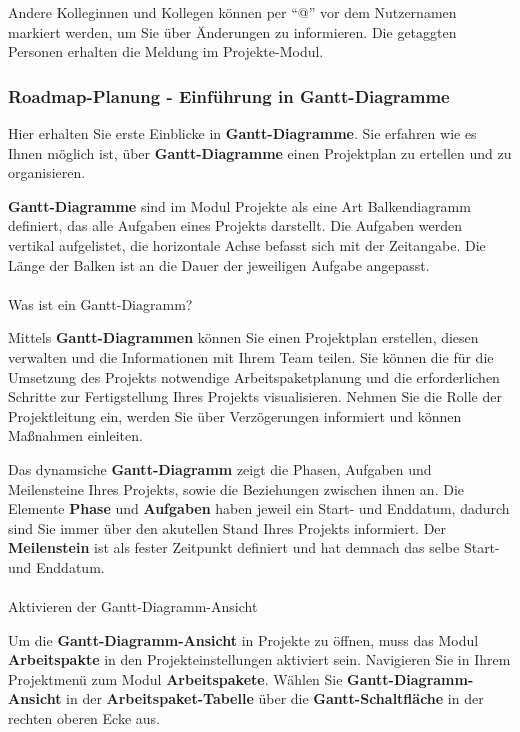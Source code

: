 \documentclass[
  letterpaper,
  DIV=11,
  numbers=noendperiod]{scrreprt}
\makeatletter
\let\oldparagraph\paragraph
\renewcommand{\paragraph}{
    \@ifstar
      \xxxParagraphStar
      \xxxParagraphNoStar
  }
\newcommand{\xxxParagraphStar}[1]{\oldparagraph*{#1}\mbox{}}
\newcommand{\xxxParagraphNoStar}[1]{\oldparagraph{#1}\mbox{}}
\makeatother
\begin{document}
Andere Kolleginnen und Kollegen können per ``@'' vor dem Nutzernamen
markiert werden, um Sie über Änderungen zu informieren. Die getaggten
Personen erhalten die Meldung im Projekte-Modul.

\subsubsection{Roadmap-Planung - Einführung in
Gantt-Diagramme}\label{roadmap-planung---einfuxfchrung-in-gantt-diagramme}

Hier erhalten Sie erste Einblicke in \textbf{Gantt-Diagramme}. Sie
erfahren wie es Ihnen möglich ist, über \textbf{Gantt-Diagramme} einen
Projektplan zu ertellen und zu organisieren.

\textbf{Gantt-Diagramme} sind im Modul Projekte als eine Art
Balkendiagramm definiert, das alle Aufgaben eines Projekts darstellt.
Die Aufgaben werden vertikal aufgelistet, die horizontale Achse befasst
sich mit der Zeitangabe. Die Länge der Balken ist an die Dauer der
jeweiligen Aufgabe angepasst.

\paragraph{Was ist ein
Gantt-Diagramm?}\label{was-ist-ein-gantt-diagramm}

Mittels \textbf{Gantt-Diagrammen} können Sie einen Projektplan
erstellen, diesen verwalten und die Informationen mit Ihrem Team teilen.
Sie können die für die Umsetzung des Projekts notwendige
Arbeitspaketplanung und die erforderlichen Schritte zur Fertigstellung
Ihres Projekts visualisieren. Nehmen Sie die Rolle der Projektleitung
ein, werden Sie über Verzögerungen informiert und können Maßnahmen
einleiten.

Das dynamsiche \textbf{Gantt-Diagramm} zeigt die Phasen, Aufgaben und
Meilensteine Ihres Projekts, sowie die Beziehungen zwischen ihnen an.
Die Elemente \textbf{Phase} und \textbf{Aufgaben} haben jeweil ein
Start- und Enddatum, dadurch sind Sie immer über den akutellen Stand
Ihres Projekts informiert. Der \textbf{Meilenstein} ist als fester
Zeitpunkt definiert und hat demnach das selbe Start- und Enddatum.

\paragraph{Aktivieren der
Gantt-Diagramm-Ansicht}\label{aktivieren-der-gantt-diagramm-ansicht}

Um die \textbf{Gantt-Diagramm-Ansicht} in Projekte zu öffnen, muss das
Modul \textbf{Arbeitspakte} in den Projekteinstellungen aktiviert sein.
Navigieren Sie in Ihrem Projektmenü zum Modul \textbf{Arbeitspakete}.
Wählen Sie \textbf{Gantt-Diagramm-Ansicht} in der
\textbf{Arbeitspaket-Tabelle} über die \textbf{Gantt-Schaltfläche} in
der rechten oberen Ecke aus.
\end{document}
